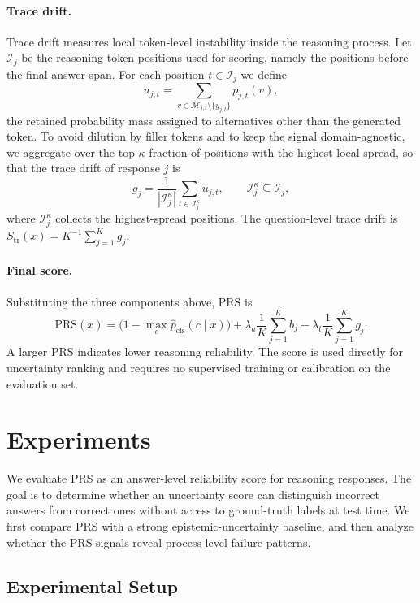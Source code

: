 \documentclass{article} %
\begin{document}
\paragraph{Trace drift.}
Trace drift measures local token-level instability inside the reasoning process.
Let $\mathcal{I}_j$ be the reasoning-token positions used for scoring, namely the
positions before the final-answer span. For each position $t\in\mathcal{I}_j$ we
define
\[
u_{j,t}
=
\sum_{v\in\mathcal{M}_{j,t}\setminus\{y_{j,t}\}}
p_{j,t}(v),
\]
the retained probability mass assigned to alternatives other than the generated
token. To avoid dilution by filler tokens and to keep the signal domain-agnostic,
we aggregate over the top-$\kappa$ fraction of positions with the highest local
spread, so that the trace drift of response $j$ is
\[
g_j
=
\frac{1}{|\mathcal{I}_j^{\kappa}|}
\sum_{t\in\mathcal{I}_j^{\kappa}}
u_{j,t},
\qquad
\mathcal{I}_j^{\kappa}\subseteq\mathcal{I}_j,
\]
where $\mathcal{I}_j^{\kappa}$ collects the highest-spread positions. The
question-level trace drift is $S_{\mathrm{tr}}(x)=K^{-1}\sum_{j=1}^{K}g_j$.

\paragraph{Final score.}
Substituting the three components above, PRS is
\[
\boxed{
\mathrm{PRS}(x)
=
\Big(1-\max_{c}\widehat{p}_{\mathrm{cls}}(c\mid x)\Big)
+
\lambda_a
\frac{1}{K}\sum_{j=1}^{K} b_j
+
\lambda_t
\frac{1}{K}\sum_{j=1}^{K} g_j
}.
\]
A larger PRS indicates lower reasoning reliability. The score is used directly
for uncertainty ranking and requires no supervised training or calibration on
the evaluation set.


\section{Experiments}
\label{sec:experiments}

We evaluate PRS as an answer-level reliability score for reasoning responses.
The goal is to determine whether an uncertainty score can distinguish incorrect
answers from correct ones without access to ground-truth labels at test time.
We first compare PRS with a strong epistemic-uncertainty baseline, and then
analyze whether the PRS signals reveal process-level failure patterns.

\subsection{Experimental Setup}
\label{sec:experimental-setup}
\end{document}
